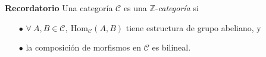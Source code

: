 \documentclass[preview]{standalone}
\begin{document}
\begin{center}
\flushleft \textbf{Recordatorio} Una categoría $\mathscr{C}$ es una $\mathbb{Z}$-\emph{categoría} si \begin{itemize} \item[$\bullet$] $\forall \ A,B\in\mathscr{C}, \ \text{Hom}_\mathscr{C}(A,B)$ tiene estructura de grupo abeliano, y \item[$\bullet$] la composición de morfismos en $\mathscr{C}$ es bilineal.\end{itemize}
\end{center}
\end{document}
